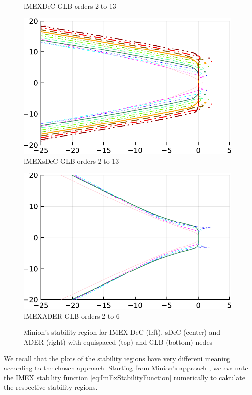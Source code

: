 \begin{figure}
\begin{minipage}[t]{0.32\textwidth}
		IMEXDeC GLB orders 2 to 13
	\end{minipage}
	\begin{minipage}[t]{0.32\textwidth}
		\centering
		\includegraphics[width=\textwidth, trim={0 0 0 22}, clip]{pdf/odepics/Minion_IMEXsDeC_GLB_ord13-crop.pdf}
		IMEXsDeC GLB orders 2 to 13
	\end{minipage}
	\begin{minipage}[t]{0.32\textwidth}
		\centering
		\includegraphics[width=\textwidth, trim={0 0 0 22}, clip]{pdf/odepics/Minion_IMEXADER_GLB_ord6-crop.pdf}
		IMEXADER GLB orders 2 to 6
	\end{minipage}
	\caption{Minion's stability region for IMEX DeC (left), sDeC (center) and ADER (right) with equispaced (top) and GLB (bottom) nodes}
	\label{fig: ODEIMEX}
\end{figure}
We recall that the plots of the stability regions have very different meaning according to the chosen approach. 
Starting from Minion's approach \cite{minion2003dec}, we evaluate the IMEX stability function \eqref{eq:ImExStabilityFunction} numerically to calculate the respective stability regions. 

